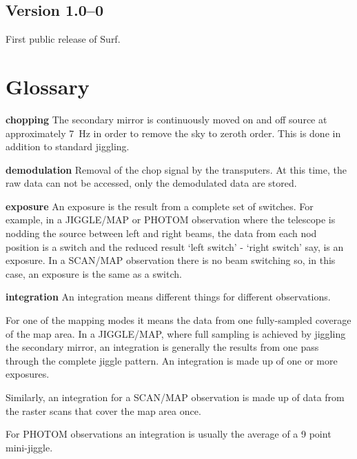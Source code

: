 \documentclass[twoside,11pt]{article}
\newcommand{\scusoft}          {{\sc Surf}}
\newcommand{\xlabel}[1]{}
\begin{document}
\subsection{Version 1.0--0}

First public release of \scusoft.


\clearpage

\section*{\xlabel{glossary}Glossary\label{glossary}}

\begin{description}

\item{{\bf chopping}} The secondary mirror is continuously moved on and off
source at approximately 7~Hz in order to remove the sky to zeroth order. This
is done in addition to standard jiggling.

\item{{\bf demodulation}} Removal of the chop signal by the transputers.
At this time, the raw data can not be accessed, only the demodulated data are
stored.

\item{{\bf exposure}} An exposure is the result from a complete set of
switches. For example, in a JIGGLE/MAP or PHOTOM observation where the
telescope is nodding the source between left and right beams, the data from
each nod position is a switch and the reduced result `left switch' - `right
switch' say, is an exposure. In a SCAN/MAP observation there is no beam
switching so, in this case, an exposure is the same as a switch.


\item{{\bf integration}} An integration means different things for different
observations.

For one of the mapping modes it means the data from one fully-sampled coverage
of the map area. In a JIGGLE/MAP, where full sampling is achieved by jiggling
the secondary mirror, an integration is generally the results from one pass
through the complete jiggle pattern. An integration is made up of one or more
exposures. 

Similarly, an integration for a SCAN/MAP observation is made up of data from
the raster scans that cover the map area once.

For PHOTOM observations an integration is usually the average of a 9 point
mini-jiggle.


\end{description}
\end{document}
